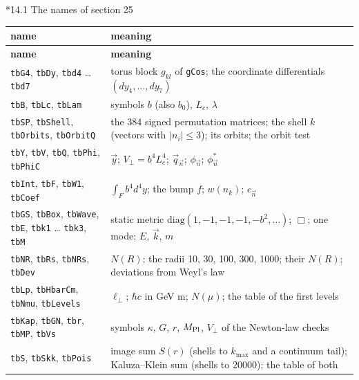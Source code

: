 \documentclass[10pt,a4paper]{article}
\makeatletter
\renewcommand\subsection{\@startsection{subsection}{2}{\z@}{-3.25ex\@plus -1ex \@minus -.2ex}{1.5ex \@plus .2ex}{\normalfont\large\bfseries\raggedright}}
\makeatother
\begin{document}
\subsection*{14.1 The names of section 25}
{\footnotesize
\begin{longtable}{>{\raggedright\arraybackslash}p{}>{\raggedright\arraybackslash}p{}}
\toprule
\textbf{name} & \textbf{meaning} \\
\midrule\endfirsthead
\toprule
\textbf{name} & \textbf{meaning} \\
\midrule\endhead
\endfoot
\bottomrule\endlastfoot
\texttt{tbG4}, \texttt{tbDy}, \texttt{tbd4} … \texttt{tbd7} & torus block $g_{kl}$ of \texttt{gCos}; the coordinate differentials $(dy_4,\dots,dy_7)$ \\
\texttt{tbB}, \texttt{tbLc}, \texttt{tbLam} & symbols $b$ (also $b_0$), $L_c$, $\lambda$ \\
\texttt{tbSP}, \texttt{tbShell}, \texttt{tbOrbits}, \texttt{tbOrbitQ} & the 384 signed permutation matrices; the shell $k$ (vectors with $|n_i|\le3$); its orbits; the orbit test \\
\texttt{tbY}, \texttt{tbV}, \texttt{tbQ}, \texttt{tbPhi}, \texttt{tbPhiC} & $\vec y$; $V_\perp=b^4L_c^4$; $\vec q_{\vec n}$; $\phi_{\vec n}$; $\phi^*_{\vec n}$ \\
\texttt{tbInt}, \texttt{tbF}, \texttt{tbW1}, \texttt{tbCoef} & $\int_Fb^4d^4y$; the bump $f$; $w(n_k)$; $c_{\vec n}$ \\
\texttt{tbGS}, \texttt{tbBox}, \texttt{tbWave}, \texttt{tbE}, \texttt{tbk1} … \texttt{tbk3}, \texttt{tbM} & static metric $\mathrm{diag}(1,-1,-1,-1,-b^2,\dots)$; $\Box$; one mode; $E$, $\vec k$, $m$ \\
\texttt{tbNR}, \texttt{tbRs}, \texttt{tbNRs}, \texttt{tbDev} & $N(R)$; the radii 10, 30, 100, 300, 1000; their $N(R)$; deviations from Weyl’s law \\
\texttt{tbLp}, \texttt{tbHbarCm}, \texttt{tbNmu}, \texttt{tbLevels} & $\ell_\perp$; $\hbar c$ in GeV m; $N(\mu)$; the table of the first levels \\
\texttt{tbKap}, \texttt{tbGN}, \texttt{tbr}, \texttt{tbMP}, \texttt{tbVs} & symbols $\kappa$, $G$, $r$, $M_{\rm Pl}$, $V_\perp$ of the Newton-law checks \\
\texttt{tbS}, \texttt{tbSkk}, \texttt{tbPois} & image sum $S(r)$ (shells to $k_{\max}$ and a continuum tail); Kaluza–Klein sum (shells to 20000); the table of both \\

\end{longtable}}
\end{document}
